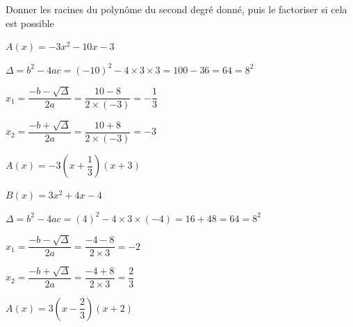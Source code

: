 \documentclass[12pt,a4paper]{article}  %
\begin{document}
Donner les racines du polynôme du second degré donné, puis le factoriser si cela est possible
\begin{enumMet}
    \item $A(x)=-3x^{2}-10 x-3$
    \begin{corrBox}
   		$\Delta=b^2-4ac=(-10)^2-4\times 3\times 3=100-36=64=8^2$ 
   		
   		$x_1=\dfrac{-b-\sqrt{\Delta}}{2a}=\dfrac{10-8}{2\times (-3)}=-\dfrac{1}{3}$
   		
   		$x_2=\dfrac{-b+\sqrt{\Delta}}{2a}=\dfrac{10+8}{2\times (-3)}=-3$
   		
   		$A(x)=-3\left(x+\dfrac{1}{3}\right)(x+3)$	
    \end{corrBox}
    \item $B(x)=3x^{2}+4x-4$
    \begin{corrBox}
    	$\Delta=b^2-4ac=(4)^2-4\times 3\times (-4)=16+48=64=8^2$ 
    	
    	$x_1=\dfrac{-b-\sqrt{\Delta}}{2a}=\dfrac{-4-8}{2\times 3}=-2$
    	
    	$x_2=\dfrac{-b+\sqrt{\Delta}}{2a}=\dfrac{-4+8}{2\times 3}=\dfrac{2}{3}$
    	
    	$A(x)=3\left(x-\dfrac{2}{3}\right)(x+2)$	
    \end{corrBox}
\end{enumMet}

\vspace{-0.3cm}
\end{document}
